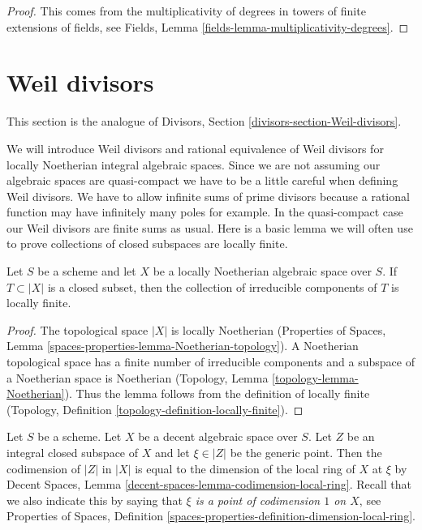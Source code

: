 \begin{proof}
This comes from the multiplicativity of degrees in towers
of finite extensions of fields, see
Fields, Lemma \ref{fields-lemma-multiplicativity-degrees}.
\end{proof}










\section{Weil divisors}
\label{section-Weil-divisors}

\noindent
This section is the analogue of Divisors, Section
\ref{divisors-section-Weil-divisors}.

\medskip\noindent
We will introduce Weil divisors and rational equivalence of Weil
divisors for locally Noetherian integral algebraic spaces.
Since we are not assuming our algebraic spaces are quasi-compact we have
to be a little careful when defining Weil divisors. We have to allow
infinite sums of prime divisors because a rational function may have
infinitely many poles for example. In the quasi-compact case our
Weil divisors are finite sums as usual. Here is a basic lemma we will
often use to prove collections of closed subspaces are locally finite.

\begin{lemma}
\label{lemma-components-locally-finite}
Let $S$ be a scheme and let $X$ be a locally Noetherian
algebraic space over $S$. If $T \subset |X|$ is a closed subset,
then the collection of irreducible components of $T$ is locally finite.
\end{lemma}

\begin{proof}
The topological space $|X|$ is locally Noetherian
(Properties of Spaces, Lemma \ref{spaces-properties-lemma-Noetherian-topology}).
A Noetherian topological space has a finite number of
irreducible components and a subspace of a Noetherian space is Noetherian
(Topology, Lemma \ref{topology-lemma-Noetherian}).
Thus the lemma follows from the definition of locally finite
(Topology, Definition \ref{topology-definition-locally-finite}).
\end{proof}

\noindent
Let $S$ be a scheme. Let $X$ be a decent algebraic space over $S$.
Let $Z$ be an integral closed subspace of $X$ and let
$\xi \in |Z|$ be the generic point. Then the codimension of
$|Z|$ in $|X|$ is equal to the dimension of the local ring
of $X$ at $\xi$ by
Decent Spaces, Lemma \ref{decent-spaces-lemma-codimension-local-ring}.
Recall that we also indicate this by saying that
{\it $\xi$ is a point of codimension $1$ on $X$}, see
Properties of Spaces, Definition
\ref{spaces-properties-definition-dimension-local-ring}.

